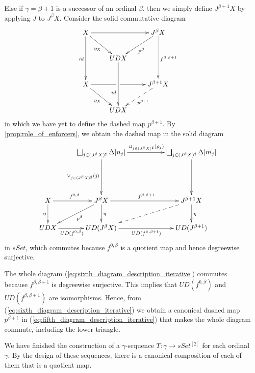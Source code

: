 Else if $\gamma =\beta +1$ is a successor of an ordinal $\beta$, then we simply define $J^{\beta +1}X$ by applying $J$ to $J^\beta X$. Consider the solid commutative diagram
\begin{equation}
\label{eq:fifth_diagram_description_iterative}
\begin{gathered}
\xymatrix{
X \ar[dd]_{id} \ar[dr]_{\eta _X} \ar[rr] && J^\beta X \ar[ld]^{p^\beta } \ar[dd]^{f^{\beta ,\beta +1}} \\
& UDX \ar[dd]_(.65){id} \\
X \ar[dr]_{\eta _X} \ar@{-}[r] & \ar[r] & J^{\beta +1}X \ar@{-->}[ld]^{p^{\beta +1}} \\
& UDX
}
\end{gathered}
\end{equation}
in which we have yet to define the dashed map $p^{\beta +1}$. By \cref{prop:role_of_enforcers}, we obtain the dashed map in the solid diagram
\begin{equation}
\label{eq:sixth_diagram_description_iterative}
\begin{gathered}
\xymatrix{
& \bigsqcup _{j\in (J^\beta X)^\sharp}\Delta [n_j] \ar[dd]_{\vee _{j\in (J^\beta X)^\sharp }(\bar{\jmath } )} \ar[rr]^{\sqcup _{j\in (J^\beta X)^\sharp }(\rho _j)} && \bigsqcup _{j\in (J^\beta X)^\sharp}\Delta [m_j] \ar[dd] \\
\\
X \ar[d]_\eta \ar[r]^{f^{0,\beta }} & J^\beta X \ar[ld]^(.45){p^\beta } \ar[d]^\eta \ar[rr]^{f^{\beta ,\beta +1}} && J^{\beta +1}X \ar@{-->}[lld] \ar[d]^\eta \\
UDX \ar[r]_(.45){UD(f^{0,\beta })} & UD(J^\beta X) \ar[rr]_{UD(f^{\beta ,\beta +1})} && UD(J^{\beta +1})
}
\end{gathered}
\end{equation}
in $sSet$, which commutes because $f^{0,\beta }$ is a quotient map and hence degreewise surjective.

The whole diagram (\ref{eq:sixth_diagram_description_iterative}) commutes because $f^{\beta ,\beta +1}$ is degreewise surjective. This implies that $UD(f^{0,\beta })$ and $UD(f^{\beta ,\beta +1})$ are isomorphisms. Hence, from (\ref{eq:sixth_diagram_description_iterative}) we obtain a canonical dashed map $p^{\beta +1}$ in (\ref{eq:fifth_diagram_description_iterative}) that makes the whole diagram commute, including the lower triangle.

We have finished the construction of a $\gamma$-sequence $T:\gamma \to sSet^{[2]}$ for each ordinal $\gamma$. By the design of these sequences, there is a canonical composition of each of them that is a quotient map.


